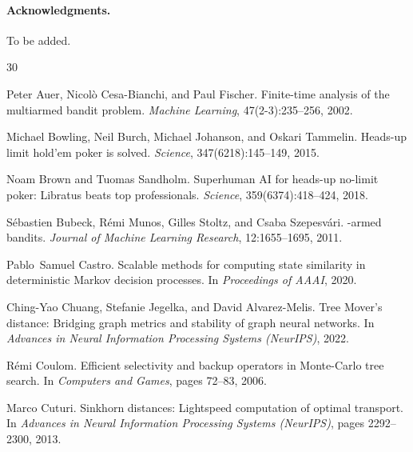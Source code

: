 \documentclass[11pt]{article}
\begin{document}
\paragraph{Acknowledgments.} To be added.



\begin{thebibliography}{30}

Peter Auer, Nicol{\`o} Cesa-Bianchi, and Paul Fischer.
\newblock Finite-time analysis of the multiarmed bandit problem.
\newblock \emph{Machine Learning}, 47(2-3):235--256, 2002.

Michael Bowling, Neil Burch, Michael Johanson, and Oskari Tammelin.
\newblock Heads-up limit hold'em poker is solved.
\newblock \emph{Science}, 347(6218):145--149, 2015.

Noam Brown and Tuomas Sandholm.
\newblock Superhuman AI for heads-up no-limit poker: {Libratus} beats top
  professionals.
\newblock \emph{Science}, 359(6374):418--424, 2018.

S{\'e}bastien Bubeck, R{\'e}mi Munos, Gilles Stoltz, and Csaba
  Szepesv{\'a}ri.
-armed bandits.
\newblock \emph{Journal of Machine Learning Research}, 12:1655--1695, 2011.

Pablo~Samuel Castro.
\newblock Scalable methods for computing state similarity in deterministic
  {Markov} decision processes.
\newblock In \emph{Proceedings of AAAI}, 2020.

Ching-Yao Chuang, Stefanie Jegelka, and David Alvarez-Melis.
\newblock Tree {M}over's distance: Bridging graph metrics and stability of
  graph neural networks.
\newblock In \emph{Advances in Neural Information Processing Systems (NeurIPS)},
  2022.

R{\'e}mi Coulom.
\newblock Efficient selectivity and backup operators in {Monte-Carlo} tree
  search.
\newblock In \emph{Computers and Games}, pages 72--83, 2006.

Marco Cuturi.
\newblock Sinkhorn distances: Lightspeed computation of optimal transport.
\newblock In \emph{Advances in Neural Information Processing Systems (NeurIPS)},
  pages 2292--2300, 2013.


\end{thebibliography}
\end{document}
